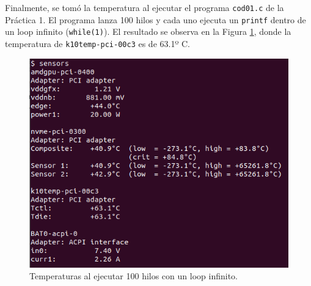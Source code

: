 \documentclass{article}
\begin{document}
Finalmente, se tomó la temperatura al ejecutar el programa \texttt{cod01.c} de la Práctica 1. El programa lanza 100 hilos y cada uno ejecuta un \texttt{printf} dentro de un loop infinito (\texttt{while(1)}). El resultado se observa en la Figura \ref{fig:temp5}, donde la temperatura de \texttt{k10temp-pci-00c3} es de 63.1º C.

\begin{figure}[htbp]

\center

\includegraphics[scale=0.5]{imagenes/temp5}

\caption{Temperaturas al ejecutar 100 hilos con un loop infinito.} \label{fig:temp5}

\end{figure}
\end{document}
